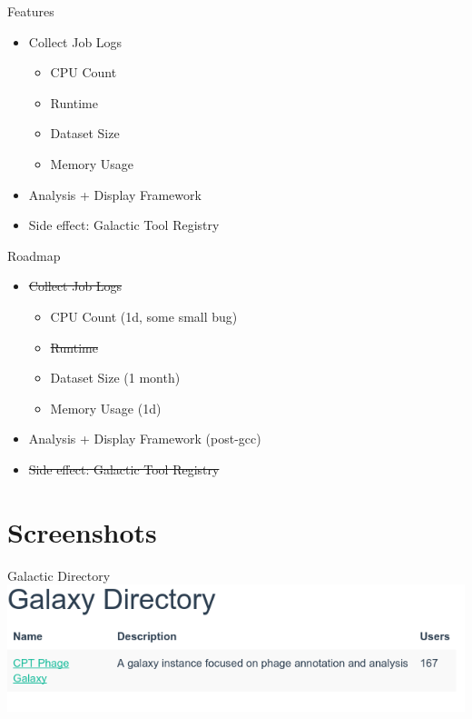 \documentclass[12pt]{beamer}
\begin{document}
\begin{frame}{Features}
    \begin{itemize}
        \item Collect Job Logs
        \begin{itemize}
            \item CPU Count
            \item Runtime
            \item Dataset Size
            \item Memory Usage
        \end{itemize}
        \item Analysis + Display Framework
        \item Side effect: Galactic Tool Registry
    \end{itemize}
\end{frame}

\begin{frame}{Roadmap}
    \begin{itemize}
        \item \sout{Collect Job Logs}
        \begin{itemize}
            \item CPU Count (1d, some small bug)
            \item \sout{Runtime}
            \item Dataset Size (1 month)
            \item Memory Usage (1d)
        \end{itemize}
        \item Analysis + Display Framework (post-gcc)
        \item \sout{Side effect: Galactic Tool Registry}
    \end{itemize}
\end{frame}

\section{Screenshots}
\begin{frame}{Galactic Directory}
    \includegraphics[width=\textwidth]{./img/directory.png}
\end{frame}
\end{document}
